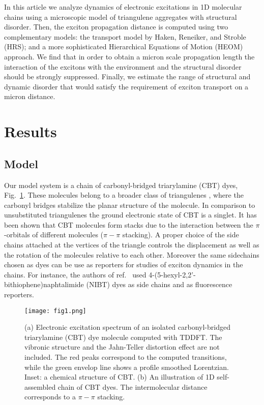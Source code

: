 \documentclass[journal=jacs,manuscript=article]{achemso}
\begin{document}
In this article we analyze dynamics of electronic excitations in 1D molecular chains using a microscopic model of triangulene aggregates with structural disorder. Then, the exciton propagation distance is computed using two complementary models: the transport model by Haken, Reneiker, and Stroble (HRS)\cite{Haken1972,Haken1973}; and a more sophisticated Hierarchical Equations of Motion (HEOM) approach.\cite{tanimura1989a,tanimura2012a,hu2011a,shi2009a,IsFl09_234111_} We find that in order to obtain a micron scale propagation length the interaction of the excitons with the environment and the structural disorder should be strongly suppressed. Finally, we estimate the range of structural and dynamic disorder that would satisfy the requirement of exciton transport on a micron distance.


\section{Results}

\subsection{Model}

Our model system is a chain of carbonyl-bridged triarylamine (CBT) dyes, Fig.~\ref{fig:struct}. These molecules belong to a broader class of triangulenes \cite{Clar1953}, where the carbonyl bridges stabilize the planar structure of the molecule. In comparison to unsubstituted triangulenes \cite{Pavlicek2017} the ground electronic state of CBT is a singlet. It has been shown that CBT molecules form stacks due to the interaction between the $\pi$-orbitals of different molecules ($\pi-\pi$ stacking). \cite{Kivala2013} A proper choice of the side chains attached at the vertices of the triangle controls the displacement as well as the rotation\cite{Haedler_JACS2016} of the molecules relative to each other. Moreover the same sidechains chosen as dyes can be use as reporters for studies of exciton dynamics in the chains. For instance, the authors of ref.~ \cite{Haedler2015} used 4-(5-hexyl-2,2'-bithiophene)naphtalimide (NIBT) dyes as side chains and as fluorescence reporters.

\begin{figure}
\begin{center}
\texttt{[image: fig1.png]}
\caption{(a) Electronic excitation spectrum of an isolated carbonyl-bridged triarylamine (CBT) dye molecule computed with TDDFT. The vibronic structure and the Jahn-Teller distortion effect are not included. The red peaks correspond to the computed transitions, while the green envelop line shows a profile smoothed Lorentzian. Inset: a chemical structure of CBT. (b) An illustration of 1D self-assembled chain of CBT dyes. The intermolecular distance corresponds to a $\pi - \pi$ stacking. }
\label{fig:struct}
\end{center}
\end{figure}
\end{document}
